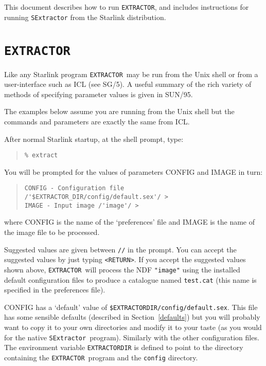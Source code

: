 \documentclass[twoside,11pt]{article}
\newcommand{\htmlref}[2]{#1}
\newcommand{\latex}[1]{#1}
\newcommand{\xref}[3]{#1}
\newcommand{\xlabel}[1]{}
\renewcommand{\_}{\texttt{\symbol{95}}}
\newcommand{\EXTRACTOR}{\texttt{EXTRACTOR}}
\newcommand{\SExtractor}{\texttt{SExtractor}}
\begin{document}
This document describes how to run \EXTRACTOR, and includes
\htmlref{instructions for running \SExtractor}{running_sextractor}
from the Starlink distribution.

\section{\xlabel{extractor}\EXTRACTOR}

Like any Starlink program \EXTRACTOR\ may be run from the
Unix shell or from a user-interface such as
\xref{ICL}{sg5}{abstract}\latex{ (see SG/5)}.
A useful summary of the rich variety of methods of specifying parameter values
is given in \xref{SUN/95}{sun95}{se_param}.

The examples below assume you are running from the Unix shell but the commands
and parameters are exactly the same from ICL.

After normal Starlink startup, at the shell prompt, type:

\begin{quote} \begin{verbatim}
% extract
\end{verbatim} \end{quote}

You will be prompted for the values of parameters CONFIG and IMAGE in turn:

\begin{quote} \begin{verbatim}
CONFIG - Configuration file /'$EXTRACTOR_DIR/config/default.sex'/ >
IMAGE - Input image /'image'/ >
\end{verbatim} \end{quote}

where CONFIG is the name of the `preferences' file and IMAGE is the name of
the image file to be processed.

Suggested values are given between \texttt{//} in the prompt.  You can
accept the suggested values by just typing \verb!<RETURN>!.  If you
accept the suggested values shown above, \EXTRACTOR\ will process the
NDF \texttt{"image"} using the installed default configuration
files to produce a catalogue named \texttt{test.cat} (this name is
specified in the preferences file).

CONFIG has a `default' value of
\texttt{\$EXTRACTOR\_DIR/config/default.sex}.  This file has some
\htmlref{sensible defaults}{defaults} \latex{(described in
Section~\ref{defaults})} but you will probably want to copy it to your
own directories and modify it to your taste (as you would for the
native \SExtractor\ program).  Similarly with the other configuration
files.  The environment variable \texttt{EXTRACTOR\_DIR} is defined to
point to the directory containing the \EXTRACTOR\ program and the
\texttt{config} directory.
\end{document}
